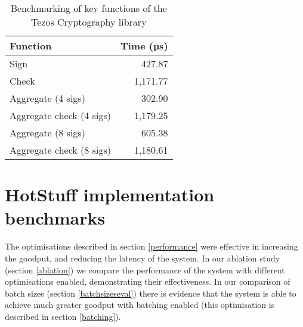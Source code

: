 \begin{table}[!h]
	\centering
	\begin{tabular}{|l|r|}
	\hline
	Function                 & Time (µs) \\ \hline
	Sign                     & 427.87   \\
	Check                    & 1,171.77 \\
	Aggregate (4 sigs)       & 302.90   \\
	Aggregate check (4 sigs) & 1,179.25 \\
	Aggregate (8 sigs)       & 605.38   \\
	Aggregate check (8 sigs) & 1,180.61 \\ \hline
	\end{tabular}
	\caption{Benchmarking of key functions of the Tezos Cryptography library}
\end{table}

\section{HotStuff implementation benchmarks} \label{hotstuffbenchmarks}
The optimisations described in section \ref{performance} were effective in increasing the goodput, and reducing the latency of the system. In our ablation study (section \ref{ablation}) we compare the performance of the system with different optimisations enabled, demonstrating their effectiveness. In our comparison of batch sizes (section \ref{batchsizeseval}) there is evidence that the system is able to achieve much greater goodput with batching enabled (this optimisation is described in section \ref{batching}).

